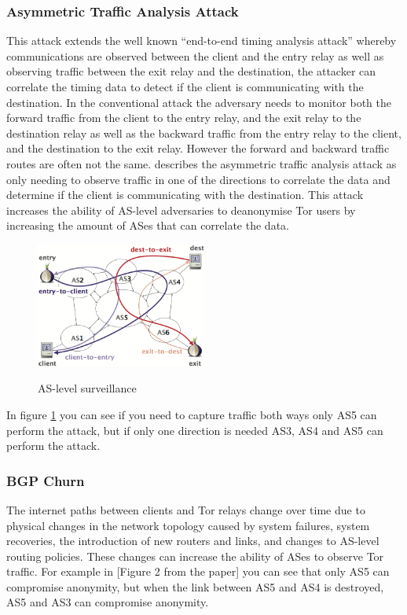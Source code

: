 \documentclass[9pt,technote]{IEEEtran}
\begin{document}
\subsubsection{Asymmetric Traffic Analysis Attack}
This attack extends the well known ``end-to-end timing analysis attack'' whereby
communications are observed between the client and the entry relay as well as
observing traffic between the exit relay and the destination, the attacker can
correlate the timing data to detect if the client is communicating with the
destination. In the conventional attack the adversary needs to monitor both the
forward traffic from the client to the entry relay, and the exit relay to the
destination relay as well as the backward traffic from the entry relay to the
client, and the destination to the exit relay. However the forward and backward
traffic routes are often not the same. \citeauthor{sun2015raptor} describes the
asymmetric traffic analysis attack as only needing to observe traffic in one of
the directions to correlate the data and determine if the client is
communicating with the destination. This attack increases the ability of
AS-level adversaries to deanonymise Tor users by increasing the amount of ASes
that can correlate the data.
\begin{figure}[h!]
\centering
\includegraphics[width=0.5\textwidth]{images/routing1.png}
\label{fig:as-routing}
\caption{AS-level surveillance\cite{sun2015raptor}}
\end{figure}
In figure \ref{fig:as-routing} you can see if you need to capture traffic both
ways only AS5 can perform the attack, but if only one direction is needed AS3,
AS4 and AS5 can perform the attack.
\subsubsection{BGP Churn}
The internet paths between clients and Tor relays change over time due to
physical changes in the network topology caused by system failures, system
recoveries, the introduction of new routers and links, and changes to AS-level
routing policies. These changes can increase the ability of ASes to observe Tor
traffic. For example in [Figure 2 from the paper] you can see that only AS5 can
compromise anonymity, but when the link between AS5 and AS4 is destroyed, AS5
and AS3 can compromise anonymity.
\end{document}
